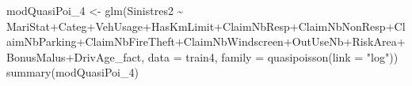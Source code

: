 \documentclass[
]{article}
\newenvironment{Shaded}{\begin{snugshade}}{\end{snugshade}}
\newcommand{\AttributeTok}[1]{\textcolor[rgb]{0.77,0.63,0.00}{#1}}
\newcommand{\FunctionTok}[1]{\textcolor[rgb]{0.00,0.00,0.00}{#1}}
\newcommand{\NormalTok}[1]{#1}
\newcommand{\OtherTok}[1]{\textcolor[rgb]{0.56,0.35,0.01}{#1}}
\newcommand{\SpecialCharTok}[1]{\textcolor[rgb]{0.00,0.00,0.00}{#1}}
\newcommand{\StringTok}[1]{\textcolor[rgb]{0.31,0.60,0.02}{#1}}
\begin{document}
\begin{Shaded}
\begin{Highlighting}[]
\NormalTok{modQuasiPoi\_4 }\OtherTok{\textless{}{-}} \FunctionTok{glm}\NormalTok{(Sinistres2 }\SpecialCharTok{\textasciitilde{}}\NormalTok{ MariStat}\SpecialCharTok{+}\NormalTok{Categ}\SpecialCharTok{+}\NormalTok{VehUsage}\SpecialCharTok{+}\NormalTok{HasKmLimit}\SpecialCharTok{+}\NormalTok{ClaimNbResp}\SpecialCharTok{+}\NormalTok{ClaimNbNonResp}\SpecialCharTok{+}\NormalTok{ClaimNbParking}\SpecialCharTok{+}\NormalTok{ClaimNbFireTheft}\SpecialCharTok{+}\NormalTok{ClaimNbWindscreen}\SpecialCharTok{+}\NormalTok{OutUseNb}\SpecialCharTok{+}\NormalTok{RiskArea}\SpecialCharTok{+}\NormalTok{BonusMalus}\SpecialCharTok{+}\NormalTok{DrivAge\_fact, }\AttributeTok{data =}\NormalTok{ train4, }\AttributeTok{family =} \FunctionTok{quasipoisson}\NormalTok{(}\AttributeTok{link =} \StringTok{"log"}\NormalTok{))}
\FunctionTok{summary}\NormalTok{(modQuasiPoi\_4)}
\end{Highlighting}
\end{Shaded}
\end{document}
